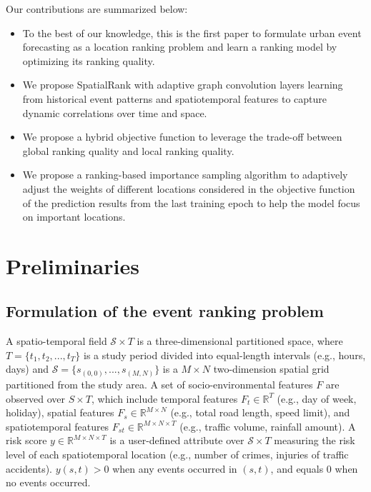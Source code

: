 \documentclass{article}
\def \S {\mathbf{S}}
\def \S {\mathcal{S}}
\begin{document}
Our contributions are summarized below:
\begin{itemize}
\vspace{-3.5mm}
    \setlength\itemsep{-0.0em}
    \item To the best of our knowledge, this is the first paper to formulate urban event forecasting as a location ranking problem and learn a ranking model by optimizing its ranking quality.
    \item We propose SpatialRank with adaptive graph convolution layers learning from historical event patterns and spatiotemporal features to capture dynamic correlations over time and space.
    \item We propose a hybrid objective function to leverage the trade-off between global ranking quality and local ranking quality.
    \item We propose a ranking-based importance sampling algorithm to adaptively adjust the weights of different locations considered in the objective function of the prediction results from the last training epoch to help the model focus on important locations. 
    
\end{itemize}

\section{Preliminaries}
\subsection{Formulation of the event ranking problem}
A spatio-temporal field $\S \times T$ is a three-dimensional partitioned space, where $T = \{t_{1}, t_{2},...,t_{T}\}$ is a study period divided into equal-length intervals (e.g., hours, days) and $\S = \{s_{(0,0)},...,s_{(M,N)}\}$ is a $M \times N$ two-dimension spatial grid partitioned from the study area. A set of socio-environmental features $F$ are observed over $S\times T$, which include temporal features $F_{t} \in \mathbb{R}^{T}$ (e.g., day of week, holiday), spatial features $F_{s} \in \mathbb{R}^{M \times N}$ (e.g., total road length, speed limit), and spatiotemporal features $F_{st} \in \mathbb{R}^{M \times N \times T}$ (e.g., traffic volume, rainfall amount). A risk score $y \in \mathbb{R}^{M \times N \times T}$ is a user-defined attribute over $\S\times T$ measuring the risk level of each spatiotemporal location (e.g., number of crimes, injuries of traffic accidents). $y(s,t) > 0$ when any events occurred in $(s, t)$, and equals 0 when no events occurred.
\end{document}
